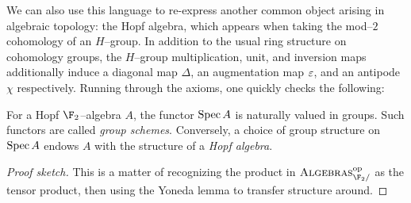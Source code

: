 We can also use this language to re-express another common object arising in algebraic topology: the Hopf algebra, which appears when taking the mod--\(2\) cohomology of an \(H\)--group.  In addition to the usual ring structure on cohomology groups, the \(H\)--group multiplication, unit, and inversion maps additionally induce a diagonal map \(\Delta\), an augmentation map \(\varepsilon\), and an antipode \(\chi\) respectively.  Running through the axioms, one quickly checks the following:
\begin{lemma}
For a Hopf \(\F_2\)--algebra \(A\), the functor \(\operatorname{Spec} A\) is naturally valued in groups.  Such functors are called \textit{group schemes}.  Conversely, a choice of group structure on \(\operatorname{Spec} A\) endows \(A\) with the structure of a \textit{Hopf algebra}.
\end{lemma}
\begin{proof}[Proof sketch]
This is a matter of recognizing the product in \(\CatOf{Algebras}_{\F_2/}^{\mathrm{op}}\) as the tensor product, then using the Yoneda lemma to transfer structure around.
\end{proof}

